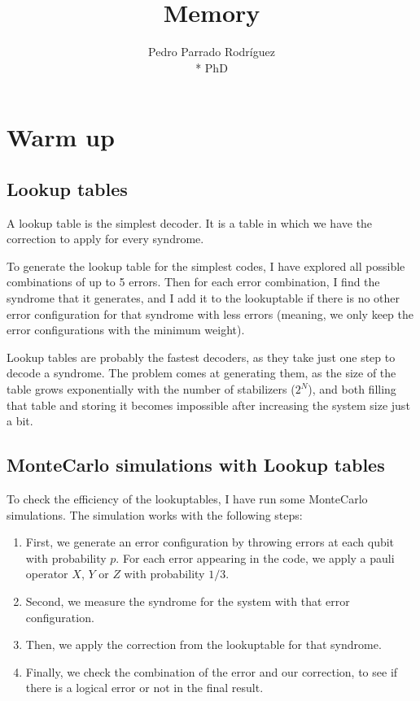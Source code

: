 \documentclass[a4paper,12pt]{article}
\author{Pedro Parrado Rodríguez\\* {\small PhD}}
\title{{\bf{Memory}}}
\date{{\scriptsize }}
\begin{document}
\maketitle

\tableofcontents
\newpage


\section{Warm up}
\subsection{Lookup tables}
A lookup table is the simplest decoder. It is a table in which we have the correction to apply for every syndrome. 

To generate the lookup table for the simplest codes, I have explored all possible combinations of up to 5 errors. Then for each error combination, I find the syndrome that it generates, and I add it to the lookuptable if there is no other error configuration for that syndrome with less errors (meaning, we only keep the error configurations with the minimum weight).

Lookup tables are probably the fastest decoders, as they take just one step to decode a syndrome. The problem comes at generating them, as the size of the table grows exponentially with the number of stabilizers ($2^N$), and both filling that table and storing it becomes impossible after increasing the system size just a bit. 


\subsection{MonteCarlo simulations with Lookup tables}

To check the efficiency of the lookuptables, I have run some MonteCarlo simulations. The simulation works with the following steps:
\begin{enumerate}
\item First, we generate an error configuration by throwing errors at each qubit with probability $p$. For each error appearing in the code, we apply a pauli operator $X$, $Y$ or $Z$ with probability $1/3$.
\item Second, we measure the syndrome for the system with that error configuration.
\item Then, we apply the correction from the lookuptable for that syndrome.
\item Finally, we check the combination of the error and our correction, to see if there is a logical error or not in the final result.
\end{enumerate}
\end{document}
